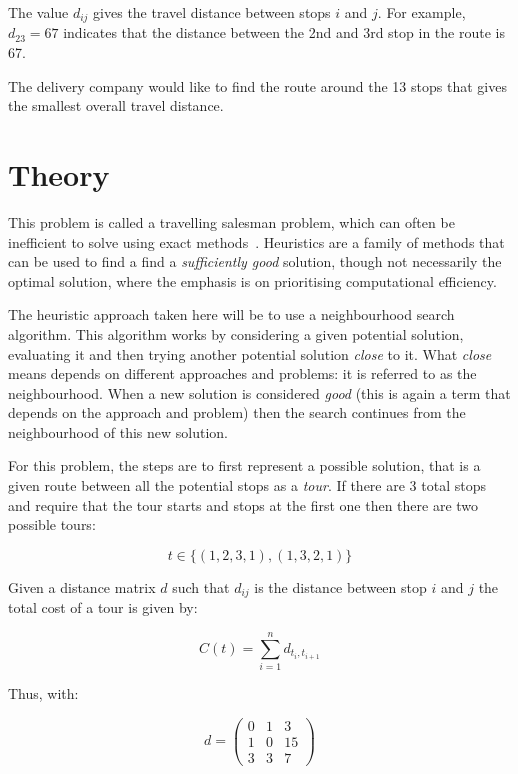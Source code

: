 \tiny{
    
}
\normalsize

The value \(d_{ij}\) gives the travel distance between
stops \(i\) and \(j\). For example, \(d_{23}=67\) %
indicates that the distance between the 2nd and 3rd stop in the route is 67. %


The delivery company would like to find the route around the 13 stops that gives
the smallest overall travel distance.


\section{Theory}\label{sec:heuristics_theory}

This problem is called a travelling salesman problem, which can
often be inefficient to solve using exact
methods~\cite{michalewicz2013solve}.
Heuristics are a family of methods that can be used to find a find a
\emph{sufficiently good} solution, though not necessarily the optimal solution,
where the emphasis is on prioritising computational efficiency.

The heuristic approach taken here will be to use a neighbourhood search algorithm.
This algorithm works by considering a given potential solution, evaluating it
and then trying another potential solution \emph{close} to it. What \emph{close}
means depends on different approaches and problems: it is referred to as the
neighbourhood. When a new solution is considered \emph{good} (this is
again a term that depends on the approach and problem) then the search
continues from the neighbourhood of this new solution.

For this problem, the steps are to first represent a possible solution, that is a given route
between all the potential stops as a \emph{tour}. If there are 3 total stops
and require that the tour starts and stops at the first one then there are two
possible tours:

\[
    t \in \{(1, 2, 3, 1), (1, 3, 2, 1)\}
\]

Given a distance matrix \(d\) such that \(d_{ij}\) is the distance between stop
\(i\) and \(j\) the total cost of a tour is given by:

\[
    C(t)=\sum_{i=1}^{n} d_{t_i, t_{i + 1}}
\]

Thus, with:

\[
    d = \begin{pmatrix}
        0 & 1 & 3\\
        1 & 0 & 15\\
        3 & 3 & 7
        \end{pmatrix}
\]

